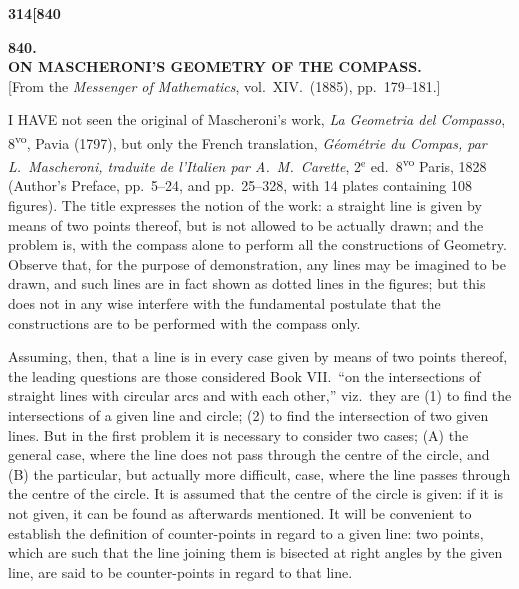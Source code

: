 \documentclass[11pt,a4paper]{book}
\begin{document}
\vspace{2em}


\newpage
\setcounter{page}{314}

\noindent\textbf{314}\hfill\textbf{[840}

\bigskip

\begin{center}
{\Large\textbf{840.}}\\[1em]
{\large\textbf{ON MASCHERONI'S GEOMETRY OF THE COMPASS.}}\\[1em]
[From the \textit{Messenger of Mathematics}, vol.\ XIV.\ (1885), pp.\ 179--181.]
\end{center}

\bigskip

\noindent I HAVE not seen the original of Mascheroni's work, \textit{La Geometria del Compasso}, 8\textsuperscript{vo}, Pavia (1797), but only the French translation, \textit{G\'eom\'etrie du Compas, par L.\ Mascheroni, traduite de l'Italien par A.~M.\ Carette}, 2$^\text{e}$ ed.\ 8\textsuperscript{vo} Paris, 1828 (Author's Preface, pp.\ 5--24, and pp.\ 25--328, with 14 plates containing 108 figures). The title expresses the notion of the work: a straight line is given by means of two points thereof, but is not allowed to be actually drawn; and the problem is, with the compass alone to perform all the constructions of Geometry. Observe that, for the purpose of demonstration, any lines may be imagined to be drawn, and such lines are in fact shown as dotted lines in the figures; but this does not in any wise interfere with the fundamental postulate that the constructions are to be performed with the compass only.

Assuming, then, that a line is in every case given by means of two points thereof, the leading questions are those considered Book VII.\ ``on the intersections of straight lines with circular arcs and with each other,'' viz.\ they are (1) to find the intersections of a given line and circle; (2) to find the intersection of two given lines. But in the first problem it is necessary to consider two cases; (A) the general case, where the line does not pass through the centre of the circle, and (B) the particular, but actually more difficult, case, where the line passes through the centre of the circle. It is assumed that the centre of the circle is given: if it is not given, it can be found as afterwards mentioned. It will be convenient to establish the definition of counter-points in regard to a given line: two points, which are such that the line joining them is bisected at right angles by the given line, are said to be counter-points in regard to that line.
\end{document}
